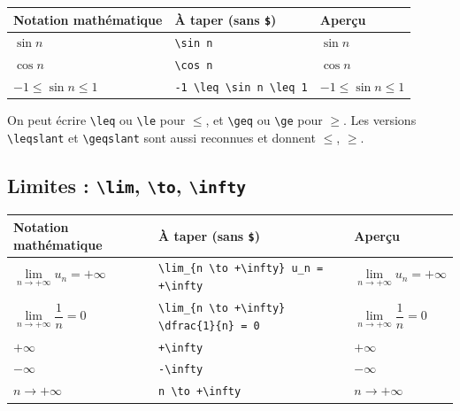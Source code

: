 \documentclass[11pt,a4paper]{article}
\begin{document}
\begin{center}
\renewcommand{\arraystretch}{1.35}
\footnotesize
\begin{tabular}{@{}p{4.2cm}p{6.2cm}p{3.8cm}@{}}
\toprule
\textbf{Notation mathématique} & \textbf{À taper (sans \texttt{\$})} & \textbf{Aperçu} \\
\midrule
\(\sin n\)              & \verb|\sin n|                  & \(\sin n\) \\
\(\cos n\)              & \verb|\cos n|                  & \(\cos n\) \\
\(-1 \leqslant \sin n \leqslant 1\) &
\verb|-1 \leq \sin n \leq 1| & \(-1 \leq \sin n \leq 1\) \\
\bottomrule
\end{tabular}
\end{center}

\begin{astuce}
On peut écrire \verb|\leq| ou \verb|\le| pour \(\leq\), et \verb|\geq| ou
\verb|\ge| pour \(\geq\). Les versions \verb|\leqslant| et \verb|\geqslant|
sont aussi reconnues et donnent \(\leqslant\), \(\geqslant\).
\end{astuce}

\subsection{Limites : \texttt{\textbackslash lim}, \texttt{\textbackslash to}, \texttt{\textbackslash infty}}

\begin{center}
\renewcommand{\arraystretch}{1.35}
\footnotesize
\begin{tabular}{@{}p{4.8cm}p{6.8cm}p{3.0cm}@{}}
\toprule
\textbf{Notation mathématique} & \textbf{À taper (sans \texttt{\$})} & \textbf{Aperçu} \\
\midrule
\(\lim\limits_{n\to+\infty} u_n = +\infty\) &
\verb|\lim_{n \to +\infty} u_n = +\infty| & \(\lim\limits_{n\to+\infty} u_n = +\infty\) \\
\(\lim\limits_{n\to+\infty} \dfrac{1}{n} = 0\) &
\verb|\lim_{n \to +\infty} \dfrac{1}{n} = 0| & \(\lim\limits_{n\to+\infty} \dfrac{1}{n} = 0\) \\
\(+\infty\) & \verb|+\infty| & \(+\infty\) \\
\(-\infty\) & \verb|-\infty| & \(-\infty\) \\
\(n \to +\infty\) & \verb|n \to +\infty| & \(n \to +\infty\) \\
\bottomrule
\end{tabular}
\end{center}
\end{document}
